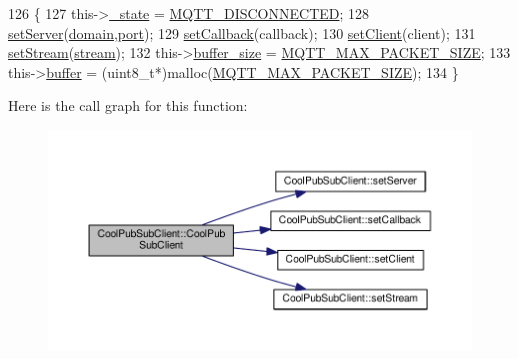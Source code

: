 \begin{DoxyCode}
126                                                                                                            
                        \{
127     this->\hyperlink{class_cool_pub_sub_client_aa1953b601206252a30efa5b114eb3e1a}{\_state} = \hyperlink{_cool_pub_sub_client_8h_adaf86a906a305dd129164982d50111b3}{MQTT\_DISCONNECTED};
128     \hyperlink{class_cool_pub_sub_client_a947e70c394c66c7d08d0c53caf8425e3}{setServer}(\hyperlink{class_cool_pub_sub_client_a08d3a5619724f3408ad406ca4fb776e1}{domain},\hyperlink{class_cool_pub_sub_client_a01e3249102c057756af7a515c179844e}{port});
129     \hyperlink{class_cool_pub_sub_client_ac5cab7658f1bdded32131241e468e661}{setCallback}(callback);
130     \hyperlink{class_cool_pub_sub_client_a7ee119b786010561ab6a9afa0798e91d}{setClient}(client);
131     \hyperlink{class_cool_pub_sub_client_ae97e40823ea689ff9e36d5bdd71bb933}{setStream}(\hyperlink{class_cool_pub_sub_client_a7a92417b317e7bd9502ed37752111705}{stream});
132     this->\hyperlink{class_cool_pub_sub_client_ae6cb10e42c057483d53516ac830ab526}{buffer\_size} = \hyperlink{_cool_pub_sub_client_8h_ae09b594688a59f1427c7e45259e039b9}{MQTT\_MAX\_PACKET\_SIZE};
133     this->\hyperlink{class_cool_pub_sub_client_a7e8bcc6096626916046a51bebadc7851}{buffer} = (uint8\_t*)malloc(\hyperlink{_cool_pub_sub_client_8h_ae09b594688a59f1427c7e45259e039b9}{MQTT\_MAX\_PACKET\_SIZE});
134 \}
\end{DoxyCode}
Here is the call graph for this function\+:\nopagebreak
\begin{figure}[H]
\begin{center}
\leavevmode
\includegraphics[width=350pt]{d8/d4b/class_cool_pub_sub_client_a6466f55abe5820d410b1c9cf7a70ec7e_cgraph}
\end{center}
\end{figure}
\mbox{\label{class_cool_pub_sub_client_aa9404bea508c0755d3d3ea29e921d60f}} 
